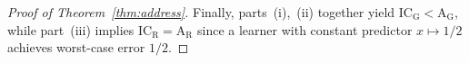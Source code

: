 \documentclass{article}
\newcommand{\ICG}{\mathrm{IC_G}}
\newcommand{\ICR}{\mathrm{IC_R}}
\newcommand{\AG}{\mathrm{A_G}}
\newcommand{\AR}{\mathrm{A_R}}
\begin{document}
\begin{proof}[Proof of Theorem~\ref{thm:address}]
Finally, parts~(i),~(ii) together yield $\ICG<\AG$, while part~(iii) implies $\ICR = \AR$ since a learner with constant predictor $x\mapsto 1/2$ achieves worst-case error $1/2$.
\end{proof}
\end{document}
